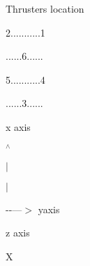 Thrusters location

2...........1

......6......

5...........4

......3......

x axis

$^\wedge$

$\vert$

$\vert$

-\/-\/---$>$ yaxis

z axis

X 